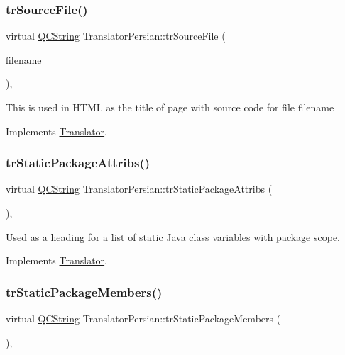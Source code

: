 \subsubsection{\texorpdfstring{trSourceFile()}{trSourceFile()}}
{\footnotesize\ttfamily virtual \mbox{\hyperlink{class_q_c_string}{Q\+C\+String}} Translator\+Persian\+::tr\+Source\+File (\begin{DoxyParamCaption}\item[{\mbox{\hyperlink{class_q_c_string}{Q\+C\+String}} \&}]{filename }\end{DoxyParamCaption})\hspace{0.3cm}{\ttfamily [inline]}, {\ttfamily [virtual]}}

This is used in H\+T\+ML as the title of page with source code for file filename 

Implements \mbox{\hyperlink{class_translator}{Translator}}.

\mbox{\label{class_translator_persian_a8b4c1237b7e9932a8cc40520405e9a2e}} 
\subsubsection{\texorpdfstring{trStaticPackageAttribs()}{trStaticPackageAttribs()}}
{\footnotesize\ttfamily virtual \mbox{\hyperlink{class_q_c_string}{Q\+C\+String}} Translator\+Persian\+::tr\+Static\+Package\+Attribs (\begin{DoxyParamCaption}{ }\end{DoxyParamCaption})\hspace{0.3cm}{\ttfamily [inline]}, {\ttfamily [virtual]}}

Used as a heading for a list of static Java class variables with package scope. 

Implements \mbox{\hyperlink{class_translator}{Translator}}.

\mbox{\label{class_translator_persian_a54f24f4944c9120bfae1c0b1af058ceb}} 
\subsubsection{\texorpdfstring{trStaticPackageMembers()}{trStaticPackageMembers()}}
{\footnotesize\ttfamily virtual \mbox{\hyperlink{class_q_c_string}{Q\+C\+String}} Translator\+Persian\+::tr\+Static\+Package\+Members (\begin{DoxyParamCaption}{ }\end{DoxyParamCaption})\hspace{0.3cm}{\ttfamily [inline]}, {\ttfamily [virtual]}}

